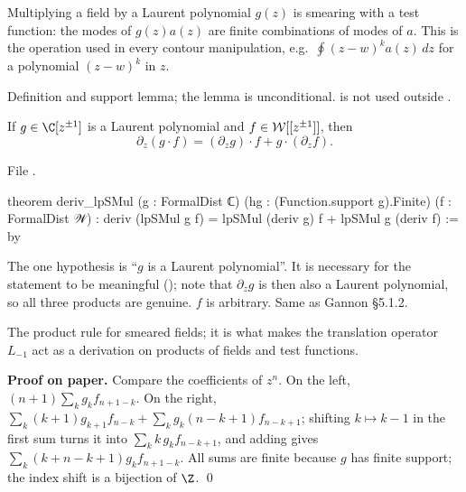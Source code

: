 \begin{physics}
Multiplying a field by a Laurent polynomial $g(z)$ is smearing with a test function: the modes of
$g(z)a(z)$ are finite combinations of modes of $a$. This is the operation used in every contour
manipulation, e.g.\ $\oint (z-w)^k a(z)\,dz$ for a polynomial $(z-w)^k$ in $z$.
\end{physics}

\begin{status}
Definition and support lemma; the lemma is unconditional.  is not used outside
.
\end{status}

\begin{theorem}\label{l01:thm:leibniz}
If $g\in\C[z^{\pm1}]$ is a Laurent polynomial and $f\in\mathcal{W}[[z^{\pm1}]]$, then
\begin{equation*}
  \partial_z(g\cdot f) = (\partial_zg)\cdot f + g\cdot(\partial_zf).
\end{equation*}
\end{theorem}

\noindent File .
\begin{leancode}
theorem deriv_lpSMul (g : FormalDist ℂ) (hg : (Function.support g).Finite) (f : FormalDist 𝒲) :
    deriv (lpSMul g f) = lpSMul (deriv g) f + lpSMul g (deriv f) := by
\end{leancode}

\begin{dictionary}
The one hypothesis  is ``$g$ is a Laurent polynomial''. It is necessary for the statement to be
meaningful (); note that $\partial_zg$ is then also a Laurent polynomial, so all
three products are genuine. $f$ is arbitrary. Same as Gannon §5.1.2.
\end{dictionary}

\begin{physics}
The product rule for smeared fields; it is what makes the translation operator $L_{-1}$ act as a
derivation on products of fields and test functions.
\end{physics}

\textbf{Proof on paper.} Compare the coefficients of $z^n$. On the left,
$(n+1)\sum_k g_kf_{n+1-k}$. On the right, $\sum_k (k+1)g_{k+1}f_{n-k} + \sum_kg_k(n-k+1)f_{n-k+1}$;
shifting $k\mapsto k-1$ in the first sum turns it into $\sum_k k\,g_kf_{n-k+1}$, and adding gives
$\sum_k(k+n-k+1)g_kf_{n+1-k}$. All sums are finite because $g$ has finite support; the index shift is a
bijection of $\Z$. \qed

